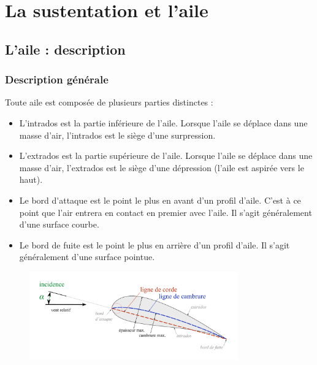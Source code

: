 \section{La sustentation et l'aile}

\subsection{L'aile : description}

\subsubsection{Description générale}
Toute aile est composée de plusieurs parties distinctes :
\begin{itemize}
	\item L'\gls{intrados} est la partie inférieure de l'aile. Lorsque l'aile se déplace dans une masse d'air, l'intrados est le siège d'une surpression.
	\item L'\gls{extrados} est la partie supérieure de l'aile. Lorsque l'aile se déplace dans une masse d'air, l'extrados est le siège d'une dépression (l'aile est aspirée vers le haut).
	\item Le \gls{bord d'attaque}  est le point le plus en avant d'un profil d'aile. C'est à ce point que l'air entrera en contact en premier avec l'aile. Il s'agit généralement d'une surface  courbe.
	\item Le \gls{bord de fuite}  est le point le plus en arrière d'un profil d'aile.  Il s'agit généralement d'une surface pointue.
\end{itemize}

	\begin{figure}[H]
  	\centering
    \includegraphics[width=0.8\textwidth]{04-Aerodynamique/img/profilAile}
	\end{figure}	
	

